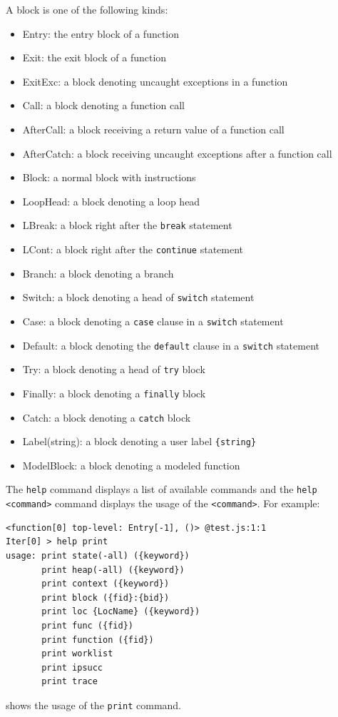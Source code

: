 A block is one of the following kinds:
\begin{itemize}
\itemsep-.1em
\item Entry: the entry block of a function
\item Exit: the exit block of a function
\item ExitExc: a block denoting uncaught exceptions in a function
\item Call: a block denoting a function call
\item AfterCall: a block receiving a return value of a function call
\item AfterCatch: a block receiving uncaught exceptions after a function call
\item Block: a normal block with instructions
\item LoopHead: a block denoting a loop head
\item LBreak: a block right after the \verb!break! statement
\item LCont: a block right after the \verb!continue! statement
\item Branch: a block denoting a branch
\item Switch: a block denoting a head of \verb!switch! statement
\item Case: a block denoting a \verb!case! clause in a \verb!switch! statement
\item Default: a block denoting the \verb!default! clause
  in a \verb!switch! statement
\item Try: a block denoting a head of \verb!try! block
\item Finally: a block denoting a \verb!finally! block
\item Catch: a block denoting a \verb!catch! block
\item Label({string}): a block denoting a user label \verb!{string}!
\item ModelBlock: a block denoting a modeled function
\end{itemize}

The \verb!help! command displays a list of available commands and
the \verb!help <command>! command displays the usage of the \verb!<command>!.
For example:
{\small
\begin{verbatim}
<function[0] top-level: Entry[-1], ()> @test.js:1:1
Iter[0] > help print
usage: print state(-all) ({keyword})
       print heap(-all) ({keyword})
       print context ({keyword})
       print block ({fid}:{bid})
       print loc {LocName} ({keyword})
       print func ({fid})
       print function ({fid})
       print worklist
       print ipsucc
       print trace
\end{verbatim}
}
\noindent
shows the usage of the \verb!print! command.

